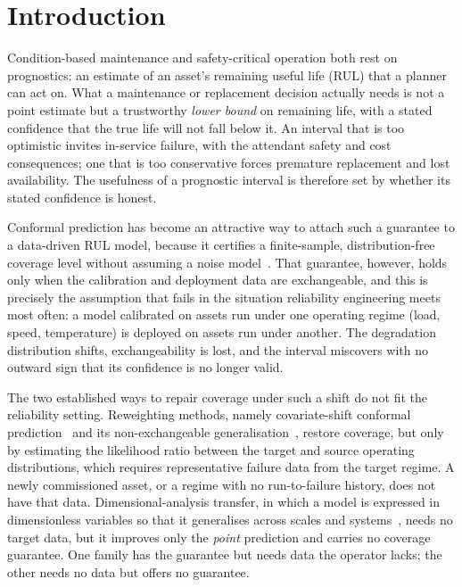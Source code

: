 \documentclass[review,times]{elsarticle}
\theoremstyle{definition}
\theoremstyle{remark}
\begin{document}
\section{Introduction}\label{sec:intro}
Condition-based maintenance and safety-critical operation both rest on prognostics: an estimate of
an asset's remaining useful life (RUL) that a planner can act on. What a maintenance or replacement
decision actually needs is not a point estimate but a trustworthy \emph{lower bound} on remaining
life, with a stated confidence that the true life will not fall below it. An interval that is too
optimistic invites in-service failure, with the attendant safety and cost consequences; one that is
too conservative forces premature replacement and lost availability. The usefulness of a prognostic
interval is therefore set by whether its stated confidence is honest.

Conformal prediction has become an attractive way to attach such a guarantee to a data-driven RUL
model, because it certifies a finite-sample, distribution-free coverage level without assuming a
noise model~\cite{vovk2005algorithmic,papadopoulos2002inductive,lei2018distribution,angelopoulos2023gentle,javanmardi2023conformal}.
That guarantee, however, holds only when the calibration and deployment data are exchangeable, and
this is precisely the assumption that fails in the situation reliability engineering meets most
often: a model calibrated on assets run under one operating regime (load, speed, temperature) is
deployed on assets run under another. The degradation distribution shifts, exchangeability is lost,
and the interval miscovers with no outward sign that its confidence is no longer valid.

The two established ways to repair coverage under such a shift do not fit the reliability setting.
Reweighting methods, namely covariate-shift conformal prediction~\cite{tibshirani2019conformal} and
its non-exchangeable generalisation~\cite{barber2023conformal}, restore coverage, but only by
estimating the likelihood ratio between the target and source operating distributions, which
requires representative failure data from the target regime. A newly commissioned asset, or a regime
with no run-to-failure history, does not have that data. Dimensional-analysis transfer, in which a
model is expressed in dimensionless variables so that it generalises across scales and
systems~\cite{oppenheimer2023multiscale,therrien2024buckingham,girard2024dimensionless}, needs no
target data, but it improves only the \emph{point} prediction and carries no coverage guarantee.
One family has the guarantee but needs data the operator lacks; the other needs no data but offers
no guarantee.
\end{document}
